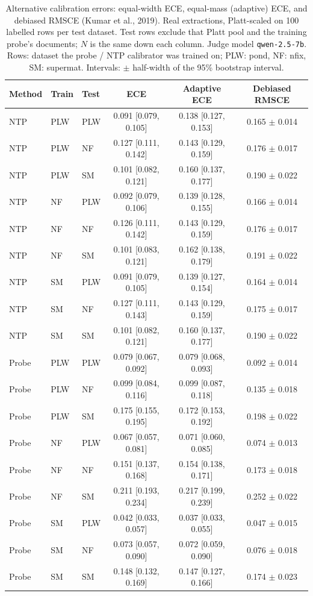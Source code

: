 \begin{table}[t]
\centering
\small
\caption{Alternative calibration errors: equal-width ECE, equal-mass (adaptive) ECE, and debiased RMSCE (Kumar et al., 2019). Real extractions, Platt-scaled on 100 labelled rows per test dataset. Test rows exclude that Platt pool and the training probe's documents; $N$ is the same down each column. Judge model \texttt{qwen-2.5-7b}. Rows: dataset the probe / NTP calibrator was trained on; PLW: pond, NF: nfix, SM: supermat. Intervals: $\pm$ half-width of the 95\% bootstrap interval.}
\label{tab:calibration-real-ece-variants}
\begin{tabular}{lllccc}
\toprule
Method & Train & Test & ECE & Adaptive ECE & Debiased RMSCE \\
\midrule
NTP & PLW & PLW & 0.091 [0.079, 0.105] & 0.138 [0.127, 0.153] & 0.165 $\pm$ 0.014 \\
NTP & PLW & NF & 0.127 [0.111, 0.142] & 0.143 [0.129, 0.159] & 0.176 $\pm$ 0.017 \\
NTP & PLW & SM & 0.101 [0.082, 0.121] & 0.160 [0.137, 0.177] & 0.190 $\pm$ 0.022 \\
NTP & NF & PLW & 0.092 [0.079, 0.106] & 0.139 [0.128, 0.155] & 0.166 $\pm$ 0.014 \\
NTP & NF & NF & 0.126 [0.111, 0.142] & 0.143 [0.129, 0.159] & 0.176 $\pm$ 0.017 \\
NTP & NF & SM & 0.101 [0.083, 0.121] & 0.162 [0.138, 0.179] & 0.191 $\pm$ 0.022 \\
NTP & SM & PLW & 0.091 [0.079, 0.105] & 0.139 [0.127, 0.154] & 0.164 $\pm$ 0.014 \\
NTP & SM & NF & 0.127 [0.111, 0.143] & 0.143 [0.129, 0.159] & 0.175 $\pm$ 0.017 \\
NTP & SM & SM & 0.101 [0.082, 0.121] & 0.160 [0.137, 0.177] & 0.190 $\pm$ 0.022 \\
\midrule
Probe & PLW & PLW & 0.079 [0.067, 0.092] & 0.079 [0.068, 0.093] & 0.092 $\pm$ 0.014 \\
Probe & PLW & NF & 0.099 [0.084, 0.116] & 0.099 [0.087, 0.118] & 0.135 $\pm$ 0.018 \\
Probe & PLW & SM & 0.175 [0.155, 0.195] & 0.172 [0.153, 0.192] & 0.198 $\pm$ 0.022 \\
Probe & NF & PLW & 0.067 [0.057, 0.081] & 0.071 [0.060, 0.085] & 0.074 $\pm$ 0.013 \\
Probe & NF & NF & 0.151 [0.137, 0.168] & 0.154 [0.138, 0.171] & 0.173 $\pm$ 0.018 \\
Probe & NF & SM & 0.211 [0.193, 0.234] & 0.217 [0.199, 0.239] & 0.252 $\pm$ 0.022 \\
Probe & SM & PLW & 0.042 [0.033, 0.057] & 0.037 [0.033, 0.055] & 0.047 $\pm$ 0.015 \\
Probe & SM & NF & 0.073 [0.057, 0.090] & 0.072 [0.059, 0.090] & 0.076 $\pm$ 0.018 \\
Probe & SM & SM & 0.148 [0.132, 0.169] & 0.147 [0.127, 0.166] & 0.174 $\pm$ 0.023 \\
\bottomrule
\end{tabular}
\end{table}
